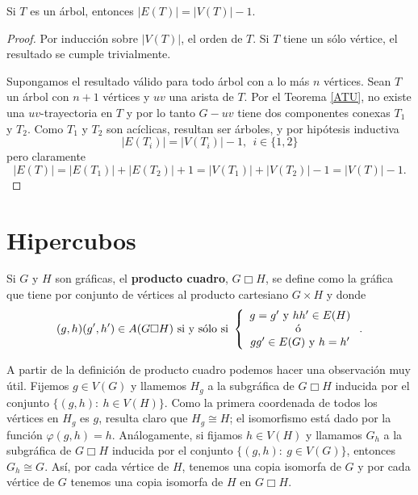 \begin{teorema}
    Si $T$ es un \'arbol, entonces $|E(T)|=|V(T)|-1$.
\end{teorema}

\begin{proof}
    Por inducci\'on sobre $|V(T)|$, el orden de $T$. Si $T$ tiene un s\' olo v\'ertice, el resultado se cumple
    trivialmente.

    Supongamos el resultado v\' alido para todo \'arbol con a lo m\' as $n$ v\'ertices. Sean $T$ un \'arbol con $n+1$
    v\'ertices y $uv $ una arista de $T$. Por el Teorema \ref{ATU}, no existe una $uv$-trayectoria en $T$ y por lo
    tanto $G - uv$ tiene dos componentes conexas $T_1$ y $T_2$. Como $T_1$ y $T_2$ son ac\' iclicas, resultan ser
    \'arboles, y por hip\'otesis inductiva $$|E(T_i)| = |V(T_i)| -1, \ \ i \in \{ 1, 2 \}$$ pero claramente $$|E(T)|
    = |E(T_1)| + |E(T_2)| + 1 = |V(T_1)|  + |V(T_2)| - 1 = |V(T)| - 1.$$
\end{proof}


\section{Hipercubos}

Si $G$ y $H$ son gr\' aficas, el \textbf{producto cuadro}, $G \Box H$, se define como la gr\' afica que tiene por
conjunto de v\' ertices al producto cartesiano $G \times H$ y donde $$(g,h)(g', h') \in A(G \Box H) \textnormal{ si y
s\'olo si }\left\{ \begin{array}{c}
                       g = g' \textnormal{ y } hh' \in E(H) \\ \textnormal{\' o } \\ gg' \in E(G) \textnormal{ y } h
                       = h'
\end{array} \right..$$

A partir de la definici\' on de producto cuadro podemos hacer una observaci\'on muy \'util. Fijemos $g \in V(G)$ y
llamemos $H_g$ a la subgr\' afica de $G \Box H$ inducida por el conjunto $\{ (g, h) \colon\ h \in V(H) \}$. Como la
primera coordenada de todos los v\'ertices en $H_g$ es $g$, resulta claro que $H_g \cong H$; el isomorfismo est\'a
dado por la funci\'on $\varphi (g,h) = h$. An\'alogamente, si fijamos $h \in V(H)$ y llamamos $G_h$ a la subgr\'
afica de $G \Box H$ inducida por el conjunto $\{ (g, h) \colon\ g \in V(G) \}$, entonces $G_h \cong G$. As\' i, por
cada v\' ertice de $H$, tenemos una copia isomorfa de $G$ y por cada v\' ertice de $G$ tenemos una copia isomorfa de
$H$ en $G \Box H$.

